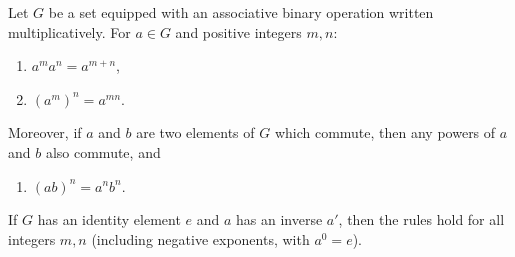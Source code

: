 Let $G$ be a set equipped with an associative binary operation written multiplicatively. For $a \in G$ and positive integers $m, n$:
\begin{enumerate}
    \item $a^m a^n = a^{m+n}$,
    \item $(a^m)^n = a^{mn}$.
\end{enumerate}
Moreover, if $a$ and $b$ are two elements of $G$ which commute, then any powers of $a$ and $b$ also commute, and
\begin{enumerate}
    \item[3.] $(ab)^n = a^n b^n$.
\end{enumerate}
If $G$ has an identity element $e$ and $a$ has an inverse $a'$, then the rules hold for all integers $m, n$ (including negative exponents, with $a^0 = e$).
